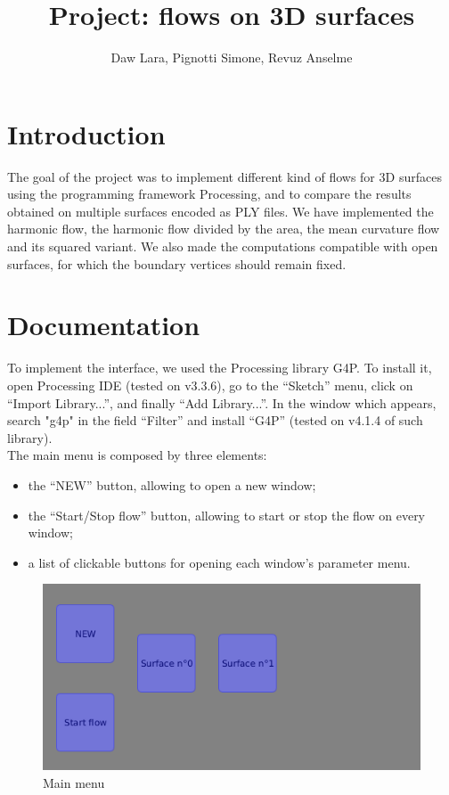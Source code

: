 \documentclass{article}
\title{Project: flows on 3D surfaces}
\author{Daw Lara, Pignotti Simone, Revuz Anselme}
\begin{document}
\maketitle

\section*{Introduction}
The goal of the project was to implement different kind of flows for 3D surfaces
using the programming framework Processing, and to compare the results obtained
on multiple surfaces encoded as PLY files. We have implemented the harmonic flow,
the harmonic flow divided by the area, the mean curvature flow and its squared
variant. We also made the computations compatible with open surfaces, for
which the boundary vertices should remain fixed.

\section*{Documentation}
To implement the interface, we used the Processing library G4P. To install it,
open Processing IDE (tested on v3.3.6), go to the ``Sketch'' menu, click on
``Import Library...'', and finally ``Add Library...''. In the window which appears,
search "g4p" in the field ``Filter'' and install ``G4P'' (tested on v4.1.4 of such library).\\

The main menu is composed by three elements:
\begin{itemize}
  \item the ``NEW'' button, allowing to open a new window;
  \item the ``Start/Stop flow'' button, allowing to start or stop the flow on every window;
  \item a list of clickable buttons for opening each window's parameter menu.
\end{itemize}

\begin{center}

\end{center}
\begin{figure}[h]
  \begin{center}
    \includegraphics[width=.5\textwidth]{img/main.png}
    \caption{Main menu}
    \label{fig:main}
  \end{center}
\end{figure}
\end{document}
